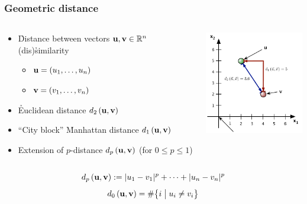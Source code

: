 \documentclass[t]{beamer} %
\begin{document}
\begin{frame}
  \frametitle{Geometric distance}

  \begin{columns}[T]
    \begin{column}{60mm}
      \begin{itemize}
      \item \h{Distance} between vectors $\vu, \vv \in \setR^n$ \so
        (dis)\h{similarity}
        \begin{itemize}
        \item $\vu = (u_1, \ldots, u_n)$
        \item $\vv = (v_1, \ldots, v_n)$
        \end{itemize}
      \item \h{Euclidean} distance $\dist[2]{\vu}{\vv}$
      \item ``City block'' \h{Manhattan} distance $\dist[1]{\vu}{\vv}$
      \item Extension of $p$-distance  $\dist[p]{\vu}{\vv}$ (for $0\leq p\leq 1$)
      \end{itemize}
    \end{column}
    \begin{column}{45mm}
      \includegraphics[width=45mm]{img/2_distance_examples}
    \end{column}
  \end{columns}
  \gap[.5]
  \[ \dist[p]{\vu}{\vv} \coloneq \abs{u_1 - v_1}^p + \dots + \abs{u_n - v_n}^p \]
  \[ \dist[0]{\vu}{\vv} = \# \bigsetdef{i}{u_i \neq v_i} \]
\end{frame}
\end{document}
